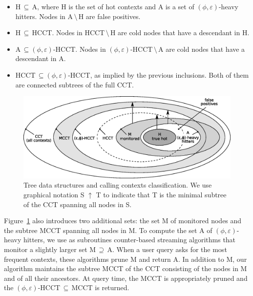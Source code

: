 \documentclass{sigplanconf}
\begin{document}
\begin{itemize}

\item H$\,\subseteq\,$A, where H is the set of hot contexts and A is a set of $(\phi,\varepsilon)$-heavy hitters. Nodes in A$\,\setminus\,$H are false positives.

\item H$\,\subseteq\,$HCCT. Nodes in HCCT$\,\setminus\,$H are cold nodes that have a descendant in H.

\item A$\,\subseteq$$(\phi,\varepsilon)$-HCCT. Nodes in $(\phi,\varepsilon)$-HCCT$\,\setminus\,$A are cold nodes that have a descendant in A.

\item HCCT$\,\subseteq$$(\phi,\varepsilon)$-HCCT, as implied by the previous inclusions. Both of them are connected subtrees of the full CCT.

\end{itemize}

\begin{figure}[t]
\center\includegraphics[width=\columnwidth]{venn.eps}
\caption{Tree data structures and calling contexts classification. We use graphical notation S $\uparrow$ T to indicate that T is the minimal subtree of the CCT spanning all nodes in S.}
\label{fig:venn}
\end{figure} 

\noindent Figure~\ref{fig:venn} also introduces two additional sets: the set M of monitored nodes and the subtree MCCT spanning all nodes in M. To compute the set A of $(\phi,\varepsilon)$-heavy hitters, we use as subroutines counter-based streaming algorithms that monitor a slightly larger set M$\,\supseteq\,$A. When a user query asks for the most frequent contexts, these algorithms prune M and return A. In addition to M, our algorithm maintains the subtree MCCT of the CCT consisting of the nodes in M and of all their ancestors. At query time, the MCCT is appropriately pruned and the $(\phi,\varepsilon)$-HCCT$\,\subseteq\,$MCCT is returned. 
\end{document}
